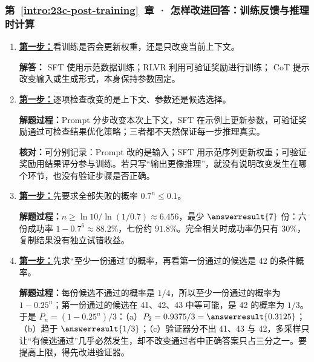 \subsubsection*{第~\ref*{intro:23c-post-training}~章 · 怎样改进回答：训练反馈与推理时计算}
\begin{enumerate}[label={},leftmargin=4.8em,itemsep=4pt]
\item[\textbf{C-093.}] \leavevmode{}\label{solution:C-093}\label{solution:reference-policy-role}\hyperref[exercise:reference-policy-role]{\textbf{第一步：}}看训练是否会更新权重，还是只改变当前上下文。\par\nobreak
\textbf{解答：} SFT 使用示范数据训练；RLVR 利用可验证奖励进行训练；
CoT 提示改变输入或生成形式，本身保持参数固定。
\item[\textbf{C-094.}] \leavevmode{}\label{solution:C-094}\label{solution:reasoning-interventions}\hyperref[exercise:reasoning-interventions]{\textbf{第一步：}}逐项检查改变的是上下文、参数还是候选选择。\par\nobreak\textbf{解题过程：}Prompt 分步改变本次上下文，SFT 在示例上更新参数，可验证奖励通过可检查结果优化策略；三者都不天然保证每一步推理真实。\par\textbf{核对：}可分别记录：Prompt 改的是输入；SFT 用示范序列更新权重；可验证奖励用结果评分参与训练。若只写“输出更像推理”，就没有说明改变发生在哪个环节，也没有验证步骤是否正确。
\item[\textbf{C-095.}] \leavevmode{}\label{solution:C-095}\label{solution:candidate-success-budget}\hyperref[exercise:candidate-success-budget]{\textbf{第一步：}}先要求全部失败的概率 $0.7^n\le0.1$。\par\nobreak
\textbf{解题过程：}$n\ge\ln10/\ln(1/0.7)\approx6.456$，最少 $\answerresult{7}$ 份：六份成功率 $1-0.7^6\approx88.2\%$，七份约 $91.8\%$。完全相关时成功率仍只有 $30\%$，复制结果没有独立试错收益。
\item[\textbf{C-096.}] \leavevmode{}\label{solution:C-096}\label{solution:faulty-verifier-limit}\hyperref[exercise:faulty-verifier-limit]{\textbf{第一步：}}先求“至少一份通过”的概率，再看第一份通过的候选是 42 的条件概率。\par\nobreak\textbf{解题过程：}每份候选不通过的概率是 $1/4$，所以至少一份通过的概率为 $1-0.25^n$；第一份通过的候选在 41、42、43 中等可能，是 42 的概率为 $1/3$。于是 $P_n=(1-0.25^n)/3$：（a）$P_2=0.9375/3=\answerresult{0.3125}$；（b）趋于 $\answerresult{1/3}$；（c）验证器分不出 41、43 与 42，多采样只让“有候选通过”几乎必然发生，却不改变通过者中正确答案只占三分之一。要提高上限，得先改进验证器。
\end{enumerate}
